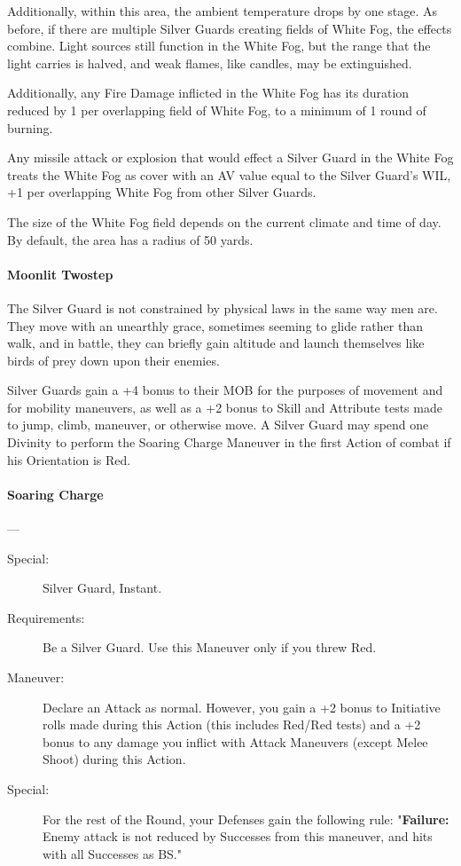 \documentclass[oneside,11pt,english]{book}
\begin{document}
Additionally, within this area, the ambient temperature drops by 
one stage. As before, if there are multiple Silver Guards creating fields of White Fog, the effects 
combine. Light sources still function in the White Fog, but the range that the light carries is  halved, and weak flames, like candles, may be extinguished. 

Additionally, any Fire Damage inflicted in the White Fog has its duration reduced by 1 per 
overlapping field of White Fog, to a minimum of 1 round of burning. 

Any missile attack or explosion that would effect a Silver Guard in the White Fog treats the White Fog as cover with an AV value equal to the Silver Guard's WIL, +1 per overlapping White Fog from other Silver Guards. 


The size of the White Fog field depends on the current climate and time of day. By default, the area has a radius of 50 yards.
\paragraph{Moonlit Twostep}
The Silver Guard is not constrained by physical laws in the same way men are. They move with 
an unearthly grace, sometimes seeming to glide rather than walk, and in battle, they can briefly 
gain altitude and launch themselves like birds of prey down upon their enemies. 


Silver Guards gain a +4 bonus to their MOB for the purposes of movement and for mobility 
maneuvers, as well as a +2 bonus to Skill and Attribute tests made to jump, climb, maneuver, or 
otherwise move. A Silver Guard may spend one Divinity to perform the Soaring Charge 
Maneuver in the first Action of combat if his Orientation is Red. 


\paragraph{\label{man:Soaring Charge}Soaring Charge}---
\begin{description}
\item [Special:] Silver Guard, Instant. 
\item [Requirements:] Be a Silver Guard. Use this Maneuver only if you threw Red. 
\item [Maneuver:] Declare an Attack as normal. However, you gain a +2 bonus to Initiative rolls made during this Action (this includes Red/Red tests) and a +2 bonus to any damage you inflict with Attack Maneuvers (except Melee Shoot) during this Action.
\item [Special:] For the rest of the Round, your Defenses gain the following rule: "\textbf{Failure:} Enemy attack is not reduced by Successes from this maneuver, and hits with all Successes as BS."
\end{description}
\end{document}
